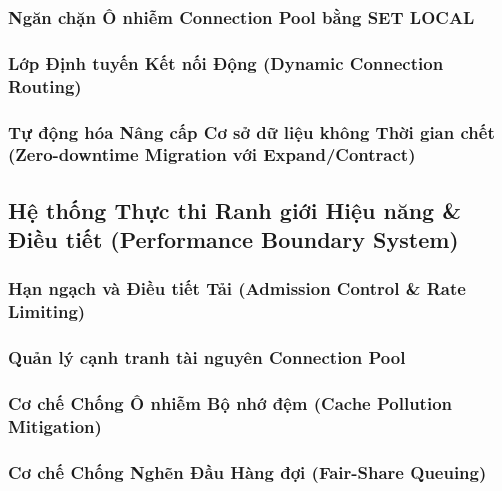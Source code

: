 \subsubsection{Ngăn chặn Ô nhiễm Connection Pool bằng SET LOCAL}
\label{outline:2:mechanisms:8}

\par{}
\subsubsection{Lớp Định tuyến Kết nối Động (Dynamic Connection Routing)}
\label{outline:2:mechanisms:9}

\par{}
\subsubsection{Tự động hóa Nâng cấp Cơ sở dữ liệu không Thời gian chết (Zero-downtime Migration với Expand/Contract)}
\label{outline:2:mechanisms:10}

\par{}
\subsection{Hệ thống Thực thi Ranh giới Hiệu năng \& Điều tiết (Performance Boundary System)}
\label{outline:2:mechanisms:11}

\par{}
\subsubsection{Hạn ngạch và Điều tiết Tải (Admission Control \& Rate Limiting)}
\label{outline:2:mechanisms:12}

\par{}
\subsubsection{Quản lý cạnh tranh tài nguyên Connection Pool}
\label{outline:2:mechanisms:13}

\par{}
\subsubsection{Cơ chế Chống Ô nhiễm Bộ nhớ đệm (Cache Pollution Mitigation)}
\label{outline:2:mechanisms:14}

\par{}
\subsubsection{Cơ chế Chống Nghẽn Đầu Hàng đợi (Fair-Share Queuing)}
\label{outline:2:mechanisms:15}

